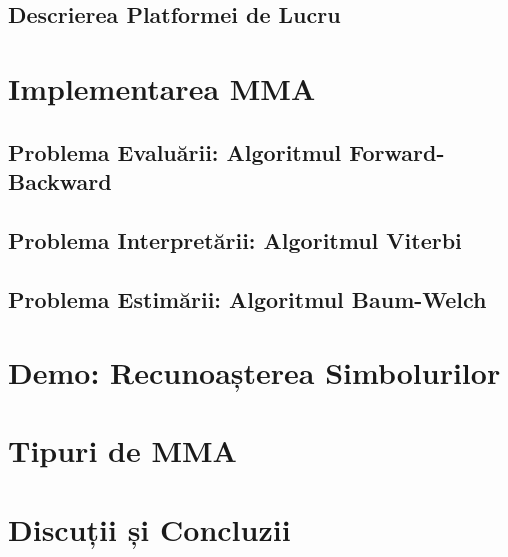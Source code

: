 \documentclass{beamer}
\begin{document}
\subsection*{Descrierea Platformei de Lucru}
\label{sec:framework}



\section{Implementarea MMA}
\label{sec:implementation}

\subsection{Problema Evaluării: Algoritmul Forward-Backward }
\label{sec:forward-backward}



\subsection{Problema Interpretării: Algoritmul Viterbi}
\label{sec:viterbi}



\subsection{Problema Estimării: Algoritmul Baum-Welch}
\label{sec:baum-welch}



\section{Demo: Recunoașterea Simbolurilor}
\label{sec:symbol-recognition}




\section{Tipuri de MMA}
\label{sec:hmm-types}



\section{Discuții și Concluzii}
\label{sec:closing}


\end{document}

